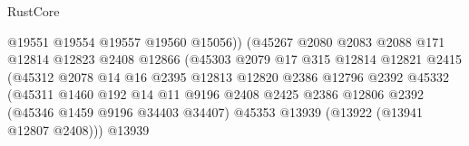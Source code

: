 \begin{lexlean}{RustCore}
\begin{coremodule}
                                              @19551
                                              @19554
                                              @19557
                                              @19560
                                              @15056))
                                          (@45267
                                            @2080
                                            @2083
                                            @2088
                                            @171
                                            @12814
                                            @12823
                                            @2408
                                            @12866
                                            (@45303
                                              @2079
                                              @17
                                              @315
                                              @12814
                                              @12821
                                              @2415
                                              (@45312
                                                @2078
                                                @14
                                                @16
                                                @2395
                                                @12813
                                                @12820
                                                @2386
                                                @12796
                                                @2392
                                                @45332
                                                (@45311
                                                  @1460
                                                  @192
                                                  @14
                                                  @11
                                                  @9196
                                                  @2408
                                                  @2425
                                                  @2386
                                                  @12806
                                                  @2392
                                                  (@45346 @1459 @9196 @34403 @34407)
                                                  @45353
                                                  @13939
                                                  (@13922 (@13941 @12807 @2408)))
                                                @13939

\end{coremodule}
\end{lexlean}
